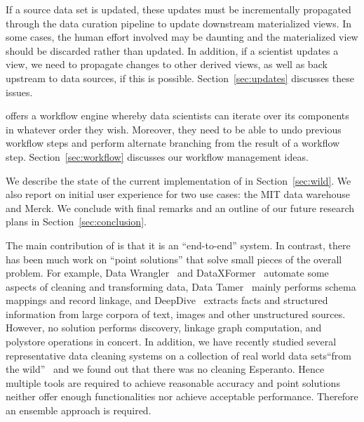 \stitle{[Updates.]}  If a source data set is updated, these updates must be
incrementally propagated through the data curation pipeline to update downstream
materialized views.  In some cases, the human effort involved may be daunting
and the materialized view should be discarded rather than updated.  In addition,
if a scientist updates a view, we need to propagate changes to other derived
views, as well as back upstream to data sources, if this is possible.
Section~\ref{sec:updates} discusses these  issues.



\stitle{[Workflow.]} \dcv offers a workflow engine whereby data scientists can
iterate over its components in whatever order they wish. Moreover, they
need to be able to undo previous workflow steps and perform alternate branching
from the result of a workflow step.  Section~\ref{sec:workflow} discusses our
workflow management ideas.

\smallskip

We describe the state of the current implementation of \dcv in
Section~\ref{sec:wild}. We also report on initial user experience for two use
cases: the MIT data warehouse and Merck. We conclude with final remarks and an
outline of our future research plans in Section~\ref{sec:conclusion}.

\smallskip
The main contribution of \dcv is that it is an ``end-to-end'' system. In
contrast, there has been much work on ``point solutions'' that solve small
pieces of the overall problem. For example, Data Wrangler~\cite{2011-wrangler}
and DataXFormer~\cite{DBLP:conf/icde/AbedjanMIOPS16} automate some aspects of
cleaning and transforming data, Data
Tamer~\cite{DBLP:conf/cidr/StonebrakerBIBCZPX13} mainly performs schema mappings
and record linkage, and DeepDive~\cite{DBLP:journals/pvldb/ShinWWSZR15} extracts
facts and structured information from large corpora of text, images and other
unstructured sources. However, no solution performs  discovery, linkage graph
computation, and polystore operations in concert. In addition, we have recently
studied several representative data cleaning systems on a collection of real
world data sets``from the wild''~\cite{DBLP:journals/pvldb/AbedjanCDFIOPST16}
and we found out that there was no cleaning Esperanto. Hence multiple tools are
required to achieve reasonable accuracy and point solutions neither offer enough
functionalities nor achieve acceptable performance. Therefore an ensemble
approach is required.

